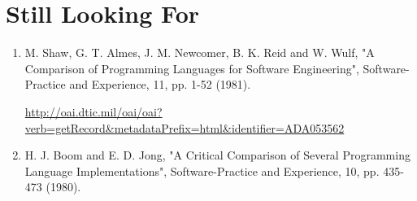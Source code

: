\documentclass{article}
\begin{document}
\section{Still Looking For}

\begin{enumerate}
    \item M. Shaw, G. T. Almes, J. M. Newcomer, B. K. Reid and W. Wulf, "A Comparison of Programming Languages for Software Engineering", Software-Practice and Experience, 11, pp. 1-52 (1981).

        \url{http://oai.dtic.mil/oai/oai?verb=getRecord&metadataPrefix=html&identifier=ADA053562}

\item H. J. Boom and E. D. Jong, "A Critical Comparison of Several Programming Language Implementations", Software-Practice and Experience, 10, pp. 435-473 (1980).
\end{enumerate}



\end{document}
